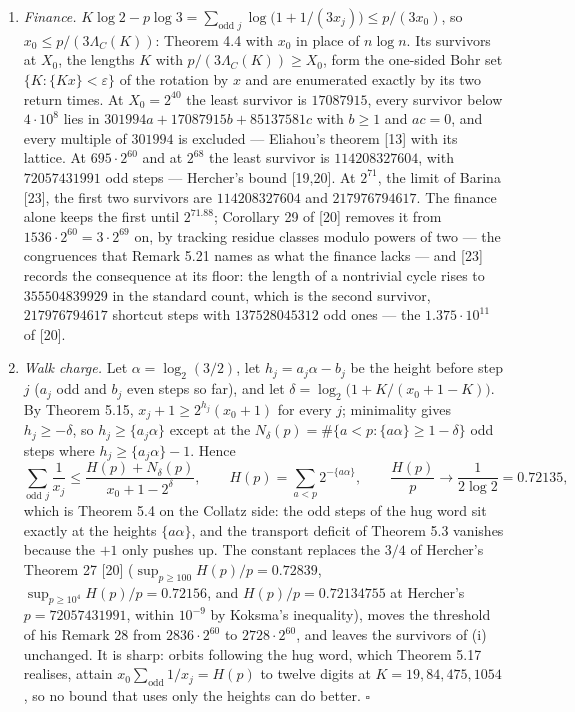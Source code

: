 \documentclass[12pt]{article}
\begin{document}
\begin{enumerate}
\def\labelenumi{(\roman{enumi})}
\item
  \emph{Finance.}
  \(K\log2-p\log3=\sum_{\text{odd }j}\log\bigl(1+1/(3x_j)\bigr)
  \le p/(3x_0)\), so \(x_0\le p/(3\Lambda_C(K))\): Theorem 4.4 with
  \(x_0\) in place of \(n\log n\). Its survivors at \(X_0\), the lengths
  \(K\) with \(p/(3\Lambda_C(K))\ge X_0\), form the one-sided Bohr set
  \(\{K:\{Kx\}<\varepsilon\}\) of the rotation by \(x\) and are
  enumerated exactly by its two return times. At \(X_0=2^{40}\) the
  least survivor is \(17087915\), every survivor below \(4\cdot10^8\)
  lies in \(301994a+17087915b+85137581c\) with \(b\ge1\) and \(ac=0\),
  and every multiple of \(301994\) is excluded --- Eliahou's theorem
  {[}13{]} with its lattice. At \(695\cdot2^{60}\) and at \(2^{68}\) the
  least survivor is \(114208327604\), with \(72057431991\) odd steps ---
  Hercher's bound {[}19,20{]}. At \(2^{71}\), the limit of Barina
  {[}23{]}, the first two survivors are \(114208327604\) and
  \(217976794617\). The finance alone keeps the first until
  \(2^{71.88}\); Corollary 29 of {[}20{]} removes it from
  \(1536\cdot2^{60}=3\cdot2^{69}\) on, by tracking residue classes
  modulo powers of two --- the congruences that Remark 5.21 names as
  what the finance lacks --- and {[}23{]} records the consequence at its
  floor: the length of a nontrivial cycle rises to \(355504839929\) in
  the standard count, which is the second survivor, \(217976794617\)
  shortcut steps with \(137528045312\) odd ones --- the
  \(1.375\cdot10^{11}\) of {[}20{]}.
\item
  \emph{Walk charge.} Let \(\alpha=\log_2(3/2)\), let
  \(h_j=a_j\alpha-b_j\) be the height before step \(j\) (\(a_j\) odd and
  \(b_j\) even steps so far), and let
  \(\delta=\log_2\bigl(1+K/(x_0+1-K)\bigr)\). By Theorem 5.15,
  \(x_j+1\ge2^{h_j}(x_0+1)\) for every \(j\); minimality gives
  \(h_j\ge-\delta\), so \(h_j\ge\{a_j\alpha\}\) except at the
  \(N_\delta(p)=\#\{a<p:\{a\alpha\}\ge1-\delta\}\) odd steps where
  \(h_j\ge\{a_j\alpha\}-1\). Hence \[
  \sum_{\text{odd }j}\frac1{x_j}\le\frac{H(p)+N_\delta(p)}{x_0+1-2^{\delta}},
  \qquad H(p)=\sum_{a<p}2^{-\{a\alpha\}},\qquad
  \frac{H(p)}{p}\to\frac1{2\log2}=0.72135,
  \] which is Theorem 5.4 on the Collatz side: the odd steps of the hug
  word sit exactly at the heights \(\{a\alpha\}\), and the transport
  deficit of Theorem 5.3 vanishes because the \(+1\) only pushes up. The
  constant replaces the \(3/4\) of Hercher's Theorem 27 {[}20{]}
  (\(\sup_{p\ge100}H(p)/p=0.72839\), \(\sup_{p\ge10^4}H(p)/p=0.72156\),
  and \(H(p)/p=0.72134755\) at Hercher's \(p=72057431991\), within
  \(10^{-9}\) by Koksma's inequality), moves the threshold of his Remark
  28 from \(2836\cdot2^{60}\) to \(2728\cdot2^{60}\), and leaves the
  survivors of (i) unchanged. It is sharp: orbits following the hug
  word, which Theorem 5.17 realises, attain
  \(x_0\sum_{\text{odd}}1/x_j=H(p)\) to twelve digits at
  \(K=19,84,475,1054\), so no bound that uses only the heights can do
  better. \(\square\)
\end{enumerate}
\end{document}
